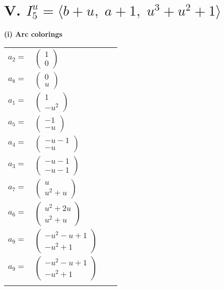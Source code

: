 \documentclass[1p]{elsarticle_modified}
\theoremstyle{definition}
\begin{document}
\centering \section*{V. $I^u_{5}= \langle b+u,\;a+1,\;u^3+u^2+1 \rangle$}
\flushleft \textbf{(i) Arc colorings}\\
\begin{tabular}{m{7pt} m{180pt} m{7pt} m{180pt} }
\flushright $a_{2}=$&$\begin{pmatrix}1\\0\end{pmatrix}$ \\
\flushright $a_{8}=$&$\begin{pmatrix}0\\u\end{pmatrix}$ \\
\flushright $a_{1}=$&$\begin{pmatrix}1\\- u^2\end{pmatrix}$ \\
\flushright $a_{5}=$&$\begin{pmatrix}-1\\- u\end{pmatrix}$ \\
\flushright $a_{4}=$&$\begin{pmatrix}- u-1\\- u\end{pmatrix}$ \\
\flushright $a_{3}=$&$\begin{pmatrix}- u-1\\- u-1\end{pmatrix}$ \\
\flushright $a_{7}=$&$\begin{pmatrix}u\\u^2+u\end{pmatrix}$ \\
\flushright $a_{6}=$&$\begin{pmatrix}u^2+2 u\\u^2+u\end{pmatrix}$ \\
\flushright $a_{9}=$&$\begin{pmatrix}- u^2- u+1\\- u^2+1\end{pmatrix}$\\ \flushright $a_{9}=$&$\begin{pmatrix}- u^2- u+1\\- u^2+1\end{pmatrix}$\\&\end{tabular}
\end{document}
